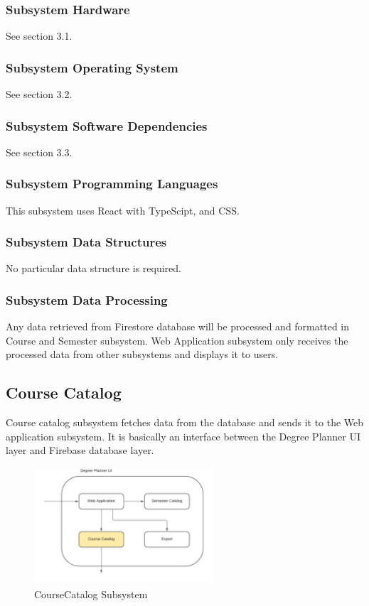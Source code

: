 \subsubsection{Subsystem Hardware}
See section 3.1.

\subsubsection{Subsystem Operating System}
See section 3.2.

\subsubsection{Subsystem Software Dependencies}
See section 3.3.

\subsubsection{Subsystem Programming Languages}
This subsystem uses React with TypeScipt, and CSS.

\subsubsection{Subsystem Data Structures}
No particular data structure is required.

\subsubsection{Subsystem Data Processing}
Any data retrieved from Firestore database will be processed and formatted in Course and Semester subsystem. Web Application subsystem only receives the processed data from other subsystems and displays it to users.

\subsection{Course Catalog}
Course catalog subsystem fetches data from the database and sends it to the Web application subsystem. It is basically an interface between the Degree Planner UI layer and Firebase database layer.
\begin{figure}[h!]
	\centering
 	\includegraphics[width=0.60\textwidth]{images/CourseCatalog} %
 \caption{CourseCatalog Subsystem} %
\end{figure}

